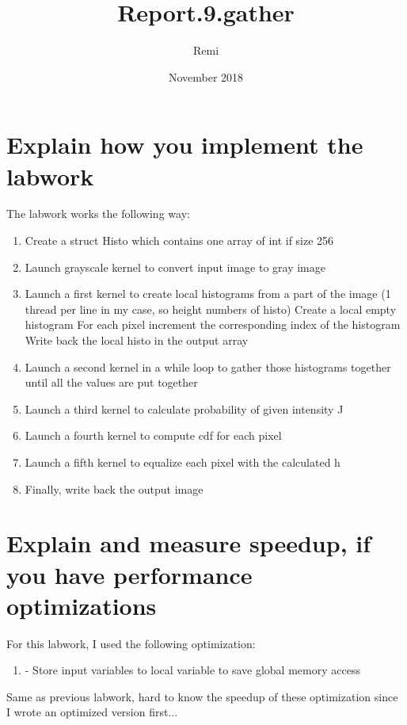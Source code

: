 \documentclass{article}
\title{Report.9.gather}
\author{Remi}
\date{November 2018}
\begin{document}
\maketitle

\section{Explain how you implement the labwork}

The labwork works the following way:
\begin{enumerate}  
\item Create a struct Histo which contains one array of int if size 256
\item Launch grayscale kernel to convert input image to gray image
\item Launch a first kernel to create local histograms from a part of the image (1 thread per line in my case, so height numbers of histo)
    \subitem Create a local empty histogram
    \subitem For each pixel increment the corresponding index of the histogram
    \subitem Write back the local histo in the output array
\item Launch a second kernel in a while loop to gather those histograms together until all the values are put together
\item Launch a third kernel to calculate probability of given intensity J
\item Launch a fourth kernel to compute cdf for each pixel
\item Launch a fifth kernel to equalize each pixel with the calculated h
\item Finally, write back the output image
\end{enumerate}

\section{Explain and measure speedup, if you have performance optimizations}
For this labwork, I used the following optimization:
\begin{enumerate}  
\item - Store input variables to local variable to save global memory access
\end{enumerate}

Same as previous labwork, hard to know the speedup of these optimization since I wrote an optimized version first...
\end{document}
